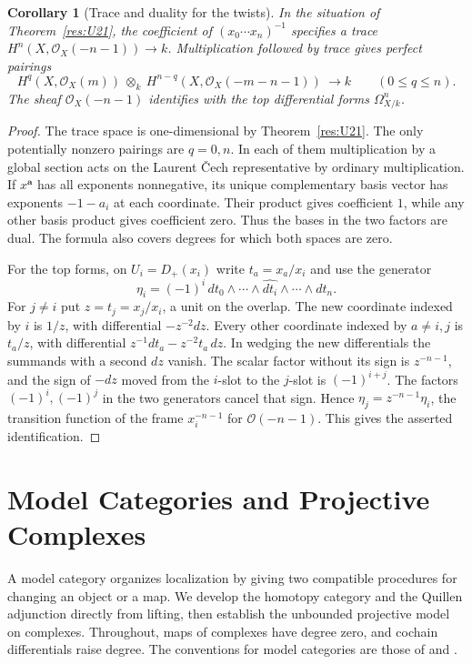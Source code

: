 \documentclass[11pt,oneside,openany]{book}
\newtheorem{corollary}[theorem]{Corollary}
\theoremstyle{definition}
\theoremstyle{remark}
\begin{document}
\begin{corollary}[Trace and duality for the twists]\label{res:U22}
In the situation of Theorem~\ref{res:U21}, the coefficient
of \((x_0\cdots x_n)^{-1}\) specifies a trace
\(H^n(X,\mathcal O_X(-n-1))\to k\).
Multiplication followed by trace gives perfect pairings
\[
 H^q(X,\mathcal O_X(m))\ \otimes_k\
 H^{n-q}(X,\mathcal O_X(-m-n-1))\ \longrightarrow k
 \qquad (0\leq q\leq n).
\]
The sheaf \(\mathcal O_X(-n-1)\) identifies with the
top differential forms \(\Omega^n_{X/k}\).
\end{corollary}
\begin{proof}
The trace space is one-dimensional by
Theorem~\ref{res:U21}. The only potentially nonzero
pairings are \(q=0,n\). In each of them multiplication
by a global section acts on the Laurent \v{C}ech
representative by ordinary multiplication. If \(x^{\mathbf a}\)
has all exponents nonnegative, its unique complementary
basis vector has exponents \(-1-a_i\) at each coordinate.
Their product gives coefficient \(1\), while any other
basis product gives coefficient zero. Thus the bases in
the two factors are dual. The formula also covers degrees
for which both spaces are zero.

For the top forms, on \(U_i=D_+(x_i)\) write
\(t_a=x_a/x_i\) and use the generator
\[
 \eta_i=(-1)^i\,d t_0\wedge\cdots
                   \wedge\widehat{d t_i}\wedge\cdots\wedge d t_n .
\]
For \(j\ne i\) put \(z=t_j=x_j/x_i\), a unit on the overlap.
The new coordinate indexed by \(i\) is \(1/z\), with
differential \(-z^{-2}dz\). Every other coordinate indexed
by \(a\ne i,j\) is \(t_a/z\), with differential
\(z^{-1}d t_a-z^{-2}t_a\,dz\). In wedging the new
differentials the summands with a second \(dz\) vanish.
The scalar factor without its sign is \(z^{-n-1}\), and
the sign of \(-d z\) moved from the \(i\)-slot to the \(j\)-slot
is \((-1)^{i+j}\). The factors \((-1)^i,(-1)^j\)
in the two generators cancel that sign. Hence
\(\eta_j=z^{-n-1}\eta_i\), the transition function of
the frame \(x_i^{-n-1}\) for \(\mathcal O(-n-1)\).
This gives the asserted identification.
\end{proof}
\chapter{Model Categories and Projective Complexes}
\label{ch:model-categories}

A model category organizes localization by giving two compatible
procedures for changing an object or a map. We develop the homotopy
category and the Quillen adjunction directly from lifting, then establish
the unbounded projective model on complexes. Throughout, maps of
complexes have degree zero, and cochain differentials raise degree.
The conventions for model categories are those of \cite[Chapter 1]{hovey}
and \cite[Section 11.3]{riehl}.
\end{document}
